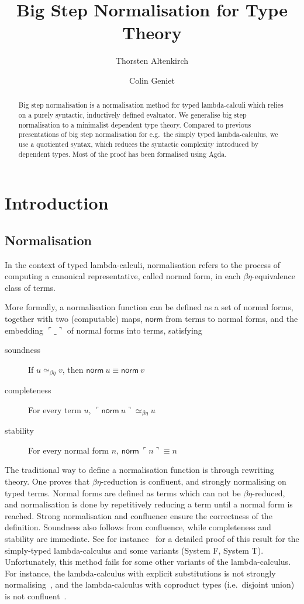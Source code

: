 \documentclass[a4paper,english]{lipics-v2019}
\title{Big Step Normalisation for Type Theory}
\author{Thorsten Altenkirch}
{School for Computer Science, University of Nottingham, United Kingdom}
{txa@cs.nott.ac.uk}{}{}
\author{Colin Geniet}
{Computer Science Department, ENS Paris-Saclay, France}
{colin.geniet@ens-paris-saclay.fr}{}{}
\newcommand{\agdaSymb}[1]{\mathsf{#1}}
\newcommand{\norm}{\agdaSymb{norm}}
\newcommand{\cul}{\ulcorner}
\newcommand{\cur}{\urcorner}
\newcommand{\Beq}{\simeq_{\beta\eta}}
\begin{document}
\maketitle

\begin{abstract}
  Big step normalisation is a normalisation method for typed lambda-calculi
  which relies on a purely syntactic, inductively defined evaluator. We
  generalise big step normalisation to a minimalist dependent type theory.
  Compared to previous presentations of big step normalisation for e.g.\
  the simply typed lambda-calculus, we use a quotiented syntax, which reduces
  the syntactic complexity introduced by dependent types. Most of the proof has
  been formalised using Agda.
\end{abstract}

\section{Introduction}
\subsection{Normalisation}
In the context of typed lambda-calculi, normalisation refers to the process of
computing a canonical representative, called normal form, in each
$\beta\eta$-equivalence class of terms.

More formally, a normalisation function can be defined as a set of normal forms,
together with two (computable) maps, $\norm$ from terms to normal forms, and the
embedding $\cul\_\cur$ of normal forms into terms, satisfying
\begin{description}
\item[soundness] If $u \Beq v$, then $\norm\ u \equiv \norm\ v$
\item[completeness] For every term $u$, $\cul \norm\ u \cur \Beq u$
\item[stability] For every normal form $n$, $\norm\ \cul n \cur \equiv n$
\end{description}

The traditional way to define a normalisation function is through rewriting
theory. One proves that $\beta\eta$-reduction is confluent, and strongly normalising
on typed terms. Normal forms are defined as terms which can not be
$\beta\eta$-reduced, and normalisation is done by repetitively reducing a term
until a normal form is reached. Strong normalisation and confluence ensure the
correctness of the definition. Soundness also follows from confluence, while
completeness and stability are immediate. See for instance~\cite{girard1989proofs}
for a detailed proof of this result for the simply-typed lambda-calculus and some
variants (System F, System T). Unfortunately, this method fails for some other
variants of the lambda-calculus. For instance, the lambda-calculus with explicit
substitutions is not strongly normalising~\cite{mellies1995explicit}, and the
lambda-calculus with coproduct types (i.e.\ disjoint union) is not
confluent~\cite{dougherty1995coproducts}.
\end{document}
